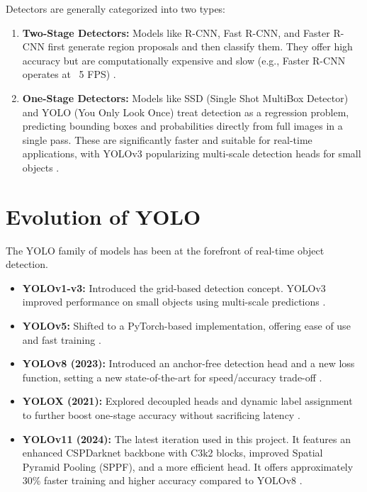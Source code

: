 \documentclass[11pt,a4paper]{report}
\begin{document}
Detectors are generally categorized into two types:
\begin{enumerate}
    \item \textbf{Two-Stage Detectors:} Models like R-CNN, Fast R-CNN, and Faster R-CNN first generate region proposals and then classify them. They offer high accuracy but are computationally expensive and slow (e.g., Faster R-CNN operates at ~5 FPS) \cite{fasterrcnn}.
    \item \textbf{One-Stage Detectors:} Models like SSD (Single Shot MultiBox Detector) and YOLO (You Only Look Once) treat detection as a regression problem, predicting bounding boxes and probabilities directly from full images in a single pass. These are significantly faster and suitable for real-time applications, with YOLOv3 popularizing multi-scale detection heads for small objects \cite{yolov3}.
\end{enumerate}

\section{Evolution of YOLO}
The YOLO family of models has been at the forefront of real-time object detection.
\begin{itemize}
    \item \textbf{YOLOv1-v3:} Introduced the grid-based detection concept. YOLOv3 improved performance on small objects using multi-scale predictions \cite{yolov3}.
    \item \textbf{YOLOv5:} Shifted to a PyTorch-based implementation, offering ease of use and fast training \cite{yolov5}.
    \item \textbf{YOLOv8 (2023):} Introduced an anchor-free detection head and a new loss function, setting a new state-of-the-art for speed/accuracy trade-off \cite{yolov8}.
    \item \textbf{YOLOX (2021):} Explored decoupled heads and dynamic label assignment to further boost one-stage accuracy without sacrificing latency \cite{yolox}.
    \item \textbf{YOLOv11 (2024):} The latest iteration used in this project. It features an enhanced CSPDarknet backbone with C3k2 blocks, improved Spatial Pyramid Pooling (SPPF), and a more efficient head. It offers approximately 30\% faster training and higher accuracy compared to YOLOv8 \cite{yolov11}.
\end{itemize}
\end{document}
